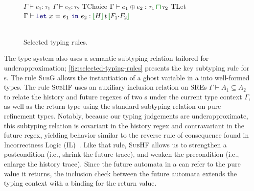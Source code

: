 \begin{figure}[t!]
{  %
  \mprooftr{35mm}
  {
  $\Gamma\vdash e_1 : \tau_1$ \quad $\Gamma\vdash e_2 : \tau_2$}
  {TChoice}
  {$\Gamma\vdash e_1 \oplus e_2 : \tau_1 \interty \tau_2$}
  \quad
  {TLet}
  {
    $\Gamma\vdash \zlet{x}{e_1}{e_2} : \uhat{H}{t}{F_1 \seqA F_2}$
  }
  \\[.8em]
  \
  \
  }
  \vspace*{-.1in}
  \caption{Selected typing rules.}
  \label{fig:selected-typing-rules}
  \vspace*{-.15in}
  \end{figure}

  The type system also uses a semantic subtyping relation tailored for
  underapproximation; \autoref{fig:selected-typing-rules} presents the
  key subtyping rule for \tyName{}s.  The rule \textsc{SubG} allows
  the instantiation of a ghost variable in a \tyName{} into
  well-formed types. The rule \textsc{SubHF} uses an auxiliary
  inclusion relation on SREs $\Gamma \vdash A_1 \subseteq A_2$ to relate
  the history and future regexes of two \tyName{}s under the current
  type context $\Gamma$, as well as the return type using the standard
  subtyping relation on pure refinement types. Notably, because our
  typing judgements are underapproximate, this subtyping relation is
  covariant in the history regex and contravariant in the future
  regex, yielding behavior similar to the reverse rule of consequence
  found in Incorrectness Logic (IL)~\cite{OHP19}.  Like that rule,
  \textsc{SubHF} allows us to strengthen a postcondition (i.e., shrink
  the future trace), and weaken the precondition (i.e., enlarge the
  history trace).  Since the future automata in a \tyName{} can refer
  to the pure value it returns, the inclusion check between the future
  automata extends the typing context with a binding for the return
  value.

